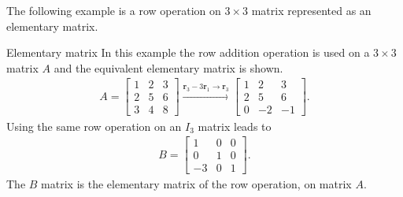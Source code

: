 The following example is a row operation on $3 \times 3$ matrix represented as an elementary matrix.
\begin{example}{Elementary matrix}
   In this example the row addition operation is used on a $3 \times 3$ matrix $A$ and the equivalent elementary matrix is shown.
   \begin{align*}
       A=
       \begin{bmatrix}
       1 & 2 & 3\\
       2 & 5 & 6\\
       3 & 4 & 8
       \end{bmatrix}
       \xrightarrow{\mathbf{r}_3-3\mathbf{r}_1\rightarrow\mathbf{r}_3}
       \begin{bmatrix}
       1 & 2 & 3\\
       2 & 5 & 6\\
       0 & -2 & -1
       \end{bmatrix}.
   \end{align*}
   Using the same row operation on an $I_3$ matrix leads to
   \begin{align*}
   B=
        \begin{bmatrix}
        1 & 0 & 0\\
        0 & 1 & 0\\
       -3 & 0 & 1
        \end{bmatrix}.
   \end{align*}
   The $B$ matrix is the elementary matrix of the row operation, on matrix $A$. 
\end{example}